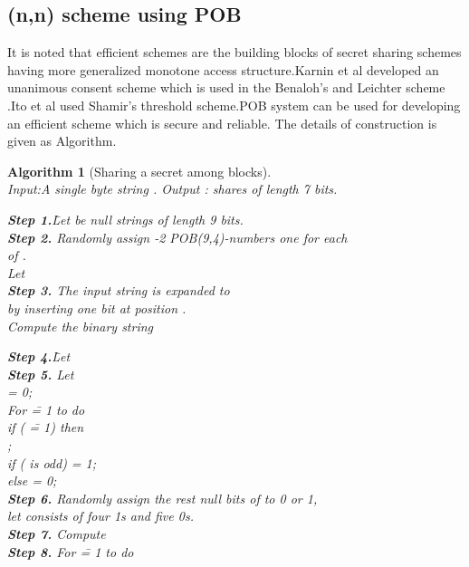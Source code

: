 \documentclass{llncs}
\newtheorem{algorithm}{Algorithm}
\begin{document}
\subsection{(n,n) scheme using POB}
It is noted that efficient  schemes are the building blocks of secret sharing schemes having more generalized monotone access structure.Karnin \cite{karnin1983} et al developed an unanimous consent scheme which is used in the Benaloh's and Leichter scheme \cite{benaloh1990generalized}.Ito et al \cite{ito1989secret} used Shamir's  threshold scheme.POB system can be used for developing an efficient  scheme which is secure and reliable.
The details of construction is given as Algorithm.\\ 
\begin{algorithm}[Sharing a secret among  blocks] \ \\
\label{alg:BShrN}
Input:A single byte string . \newline
Output :  shares  of length 7 bits.\\
\begin{tabbing}
\textbf{Step 1.}\;\= Let  be null strings of length 9 bits.\\
\textbf{Step 2.}\> Randomly assign -2 POB(9,4)-numbers one for each \\
                \> of .\\
                \> Let  \\
\textbf{Step 3.}\> The input string  is expanded to \\\> by inserting one bit at position .\\
                \> Compute the binary string \mbox{}
\end{tabbing}
\begin{tabbing}
\textbf{Step 4.}\;\= Let \\
\textbf{Step 5.}\> Let     \\
       \>   = 0; \\
       \>  For  \= = 1 to  do \\
       \>\>  if ( \= = 1) then \\
       \>\>\>   ; \\
       \>\>\>   if ( is odd)  = 1;\\
       \>\>\>   else  = 0;         \\
\textbf{Step 6.}\> Randomly assign the rest null bits of  to 0 or 1,\\
                \> let  consists of four 1s and five 0s.\\
\textbf{Step 7.}\> Compute  \\
\textbf{Step 8.}\> For \= = 1 to  do \\
      \>\>
       \end{tabbing}
\end{algorithm}
\end{document}
